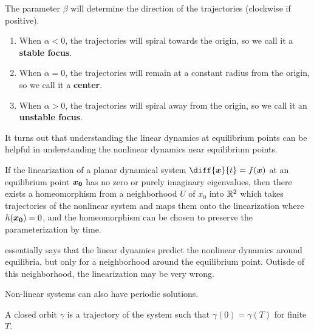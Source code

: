 \begin{enumerate}
\[		\]
		The parameter $\beta$ will determine the direction of the trajectories
		(clockwise if positive).
		\begin{enumerate}
			\item When $\alpha < 0$, the trajectories will spiral towards the origin,
				so we call it a \textbf{stable focus}.
			\item When $\alpha = 0$, the trajectories will remain at a constant radius
				from the origin, so we call it a \textbf{center}.
			\item When $\alpha > 0$, the trajectories will spiral away from the
				origin, so we call it an \textbf{unstable focus}.
		\end{enumerate}
\end{enumerate}
It turns out that understanding the linear dynamics at equilibrium points can be helpful in
understanding the nonlinear dynamics near equilibrium points.
\begin{theorem}
	If the linearization of a planar dynamical system $\diff{\bs{x}}{t} =
	f(\bs{x})$ at an equilibrium point $\boldsymbol{x_0}$ has no zero or purely imaginary eigenvalues, then there exists a
	homeomorphism from a neighborhood $U$ of $x_0$ into $\mathbb{R}^2$ which takes
	trajectories of the nonlinear system and maps them onto the linearization
	where $h(\boldsymbol{x_0}) = 0$, and the homeomorphism can be chosen to preserve the
	parameterization by time.
	\label{thm:hartman-grobman}
\end{theorem}
 essentially says that the linear dynamics predict the
nonlinear dynamics around equilibria, but only for a neighborhood around the
equilibrium point. Outisde of this neighborhood, the linearization may be very
wrong.

Non-linear systems can also have periodic solutions.
\begin{definition}
	A closed orbit $\gamma$ is a trajectory of the system such that $\gamma(0) =
	\gamma(T)$ for finite $T$.
	\label{defn:closed-orbit}
\end{definition}

